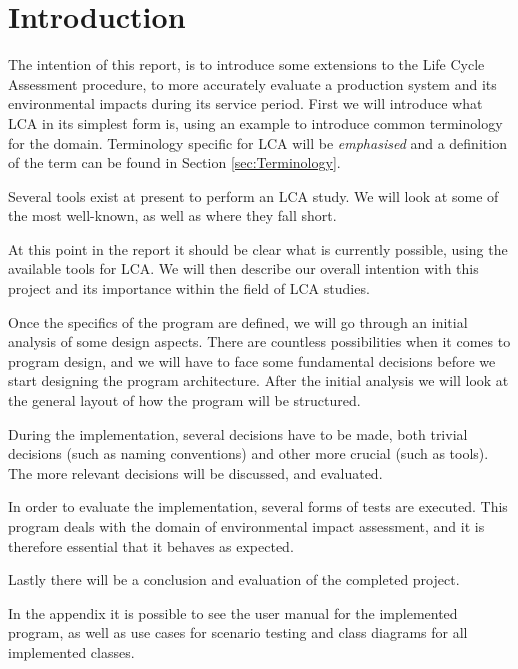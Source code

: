 \chapter{Introduction}\label{chap:Introduction}

The intention of this report, is to introduce some extensions to the Life Cycle Assessment procedure, to more accurately evaluate a production system and its environmental impacts during its service period. First we will introduce what LCA in its simplest form is, using an example to introduce common terminology for the domain. Terminology specific for LCA will be \emph{emphasised} and a definition of the term can be found in Section \ref{sec:Terminology}.

Several tools exist at present to perform an LCA study. We will look at some of the most well-known, as well as where they fall short. 

At this point in the report it should be clear what is currently possible, using the available tools for LCA. We will then describe our overall intention with this project and its importance within the field of LCA studies.

Once the specifics of the program are defined, we will go through an initial analysis of some design aspects. There are countless possibilities when it comes to program design, and we will have to face some fundamental decisions before we start designing the program architecture. After the initial analysis we will look at the general layout of how the program will be structured.

During the implementation, several decisions have to be made, both trivial decisions (such as naming conventions) and other more crucial (such as tools). The more relevant decisions will be discussed, and evaluated. 

In order to evaluate the implementation, several forms of tests are executed. This program deals with the domain of environmental impact assessment, and it is therefore essential that it behaves as expected. 

Lastly there will be a conclusion and evaluation of the completed project.

In the appendix it is possible to see the user manual for the implemented program, as well as use cases for scenario testing and class diagrams for all implemented classes.